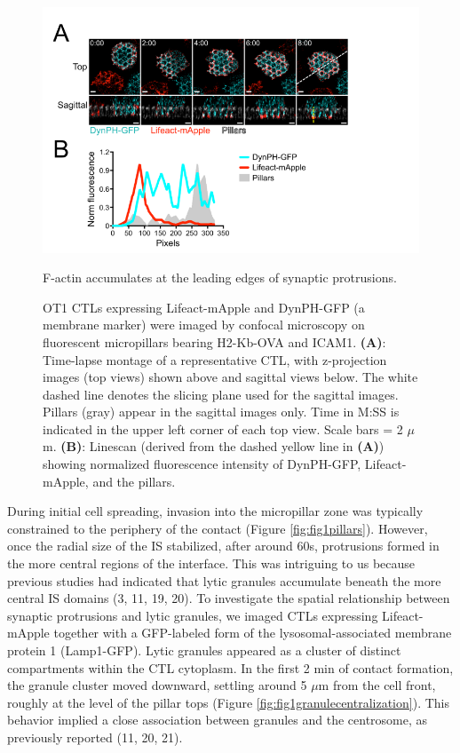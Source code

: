 \begin{figure}[htbp]
	\centering
	\includegraphics[width=\textwidth]{../figures/chapter2/fig1actinleadingedge.png}
	\caption{F-actin accumulates at the leading edges of synaptic protrusions.}
	\caption*{OT1 CTLs expressing Lifeact-mApple and DynPH-GFP (a membrane marker) were imaged by confocal microscopy on fluorescent micropillars bearing H2-Kb-OVA and ICAM1. \textbf{(A)}: Time-lapse montage of a representative CTL, with z-projection images (top views) shown above and sagittal views below. The white dashed line denotes the slicing plane used for the sagittal images. Pillars (gray) appear in the sagittal images only. Time in M:SS is indicated in the upper left corner of each top view. Scale bars = 2 $\mu$m. \textbf{(B)}: Linescan (derived from the dashed yellow line in \textbf{(A)}) showing normalized fluorescence intensity of DynPH-GFP, Lifeact-mApple, and the pillars.}
	\label{fig:fig1actinleadingedge}
\end{figure}

During initial cell spreading, invasion into the micropillar zone was typically constrained to the periphery of the contact (Figure \ref{fig:fig1pillars}). However, once the radial size of the IS stabilized, after around 60s, protrusions formed in the more central regions of the interface. This was intriguing to us because previous studies had indicated that lytic granules accumulate beneath the more central IS domains (3, 11, 19, 20). To investigate the spatial relationship between synaptic protrusions and lytic granules, we imaged CTLs expressing Lifeact-mApple together with a GFP-labeled form of the lysosomal-associated membrane protein 1 (Lamp1-GFP). Lytic granules appeared as a cluster of distinct compartments within the CTL cytoplasm. In the first 2 min of contact formation, the granule cluster moved downward, settling around 5 $\mu$m from the cell front, roughly at the level of the pillar tops (Figure \ref{fig:fig1granulecentralization}). This behavior implied a close association between granules and the centrosome, as previously reported (11, 20, 21).

